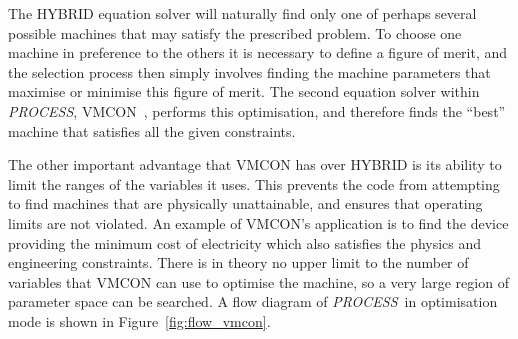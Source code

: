 \documentclass[11pt,a4paper]{report}
\newcommand{\PS}{\mbox{\it PROCESS\/ }}
\newcommand{\PSC}{\mbox{\it PROCESS},\/ }
\begin{document}
The HYBRID equation solver will naturally find only one of perhaps several
possible machines that may satisfy the prescribed problem. To choose one
machine in preference to the others it is necessary to define a figure of
merit, and the selection process then simply involves finding the machine
parameters that maximise or minimise this figure of merit. The second equation
solver within \PSC VMCON~\cite{vmcon}, performs this optimisation, and
therefore finds the ``best'' machine that satisfies all the given constraints.

The other important advantage that VMCON has over HYBRID is its ability to
limit the ranges of the variables it uses. This prevents the code from
attempting to find machines that are physically unattainable, and ensures that
operating limits are not violated. An example of VMCON's application is to
find the device providing the minimum cost of electricity which also satisfies
the physics and engineering constraints. There is in theory no upper limit to
the number of variables that VMCON can use to optimise the machine, so a very
large region of parameter space can be searched. A flow diagram of \PS in
optimisation mode is shown in Figure~\ref{fig:flow_vmcon}.


\setlength{\unitlength}{1mm}
\end{document}
